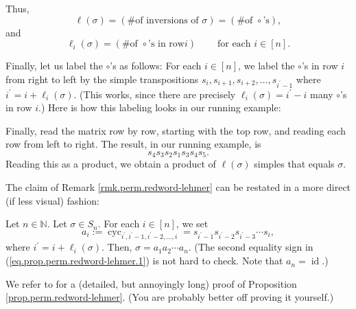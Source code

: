\begin{remark}
Thus,%
\[
\ell\left(  \sigma\right)  =\left(  \text{\# of inversions of }\sigma\right)
=\left(  \text{\# of }\circ\text{'s}\right)  ,
\]
and%
\[
\ell_{i}\left(  \sigma\right)  =\left(  \text{\# of }\circ\text{'s in row
}i\right)  \ \ \ \ \ \ \ \ \ \ \text{for each }i\in\left[  n\right]  .
\]


Finally, let us label the $\circ$'s as follows: For each $i\in\left[
n\right]  $, we label the $\circ$'s in row $i$ from right to left by the
simple transpositions $s_{i},s_{i+1},s_{i+2},\ldots,s_{i^{\prime}-1}$ where
$i^{\prime}=i+\ell_{i}\left(  \sigma\right)  $. (This works, since there are
precisely $\ell_{i}\left(  \sigma\right)  =i^{\prime}-i$ many $\circ$'s in row
$i$.) Here is how this labeling looks in our running example:%
\[%
\]


Finally, read the matrix row by row, starting with the top row, and reading
each row from left to right. The result, in our running example, is%
\[
s_{4}s_{3}s_{2}s_{1}s_{3}s_{4}s_{5}.
\]
Reading this as a product, we obtain a product of $\ell\left(  \sigma\right)
$ simples that equals $\sigma$.
\end{remark}

The claim of Remark \ref{rmk.perm.redword-lehmer} can be restated in a more
direct (if less visual) fashion:

\begin{proposition}
\label{prop.perm.redword-lehmer}Let $n\in\mathbb{N}$. Let $\sigma\in S_{n}$.
For each $i\in\left[  n\right]  $, we set%
\begin{equation}
a_{i}:=\operatorname*{cyc}\nolimits_{i^{\prime},i^{\prime}-1,i^{\prime
}-2,\ldots,i}=s_{i^{\prime}-1}s_{i^{\prime}-2}s_{i^{\prime}-3}\cdots s_{i},
\label{eq.prop.perm.redword-lehmer.1}%
\end{equation}
where $i^{\prime}=i+\ell_{i}\left(  \sigma\right)  $. Then, $\sigma=a_{1}%
a_{2}\cdots a_{n}$. (The second equality sign in
(\ref{eq.prop.perm.redword-lehmer.1}) is not hard to check. Note that
$a_{n}=\operatorname*{id}$.)
\end{proposition}

We refer to \cite[Exercise 5.21 parts \textbf{(b)} and \textbf{(c)}]{detnotes}
for a (detailed, but annoyingly long) proof of Proposition
\ref{prop.perm.redword-lehmer}. (You are probably better off proving it yourself.)
